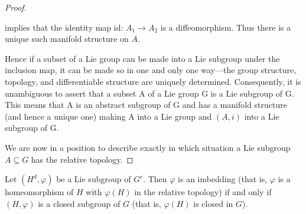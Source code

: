 \begin{proof}
\begin{center}
\end{center}

implies that the identity map id: $A_{1} \to A_{2}$ is a diffeomorphism. Thus there is a unique such manifold structure on $A$.

Hence if a subset of a Lie group can be made into a Lie subgroup under the inclusion map, it can be made so in one and only one way—the group structure, topology, and differentiable structure are uniquely determined. Consequently, it is unambiguous to assert that a subset A of a Lie group G is a Lie subgroup of G. This means that A is an abstract subgroup of G and has a manifold structure (and hence a unique one) making A into a Lie group and  $ (A,i) $ into a Lie subgroup of G.

We are now in a position to describe exactly in which situation a Lie subgroup $A \subseteq G$ has the relative topology.

\end{proof}

\begin{theorem}\label{thm:3.21}
Let $(H^{d},\varphi)$ be a Lie subgroup of $G^{c}$. Then $\varphi$ is an imbedding (that is, $\varphi$ is a homeomorphism of $H$ with $\varphi(H)$ in the relative topology) if and only if $(H,\varphi)$ is a closed subgroup of $G$ (that is, $\varphi(H)$ is closed in $G$).

\end{theorem}

